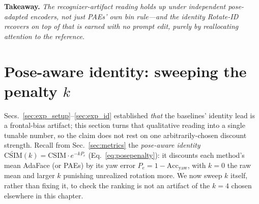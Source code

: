 \noindent\textbf{Takeaway.} \emph{The recognizer-artifact reading holds up
under independent pose-adapted encoders, not just PAEs' own bin rule---and the
identity Rotate-ID recovers on top of that is earned with no prompt edit,
purely by reallocating attention to the reference.}

\begin{table}[t]\centering\small
\setlength{\tabcolsep}{5pt}
\caption[Identity ablation]{\textbf{Identity ablation} ($1400$ generations): mean AdaFace and PAEs CSIM
over detected faces, \emph{raw} and \emph{pose-aware}
$\widetilde{\mathrm{CSIM}}{=}\mathrm{CSIM}\cdot e^{-4P_e}$ at $k{=}4$
(Eq.~\ref{eq:posepenalty}). From the naive FLUX.2 base (identity image\,+\,prompt,
no structural control), \dupid{} and the learned gate recover identity
\emph{purely by reallocating attention to the reference}---no prompt edit. All three
configurations rotate comparably ($73.6$--$82.9\%$ yaw), so the gains persist under
the pose-aware discount.}
\label{tab:id_bins}
\end{table}

\FloatBarrier
\section{Pose-aware identity: sweeping the penalty $k$}
\label{sec:exp_penalized}
Secs.~\ref{sec:exp_setup}--\ref{sec:exp_id} established \emph{that} the
baselines' identity lead is a frontal-bias artifact; this section turns that
qualitative reading into a single tunable number, so the claim does not rest
on one arbitrarily-chosen discount strength. Recall from Sec.~\ref{sec:metrics}
the \emph{pose-aware identity}
$\widetilde{\mathrm{CSIM}}(k)=\mathrm{CSIM}\cdot e^{-k P_e}$
(Eq.~\ref{eq:posepenalty}): it discounts each method's mean AdaFace (or PAEs)
\csim{} by its yaw error $P_e{=}1-\mathrm{Acc_{yaw}}$, with $k{=}0$ the raw mean and
larger $k$ punishing unrealized rotation more. We now sweep $k$ itself, rather
than fixing it, to check the ranking is not an artifact of the $k{=}4$ chosen
elsewhere in this chapter.

